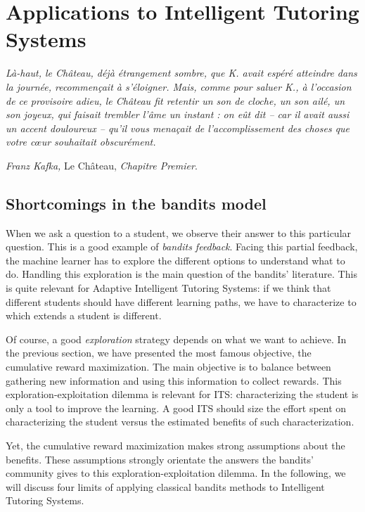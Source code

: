 \chapter{Applications to Intelligent Tutoring Systems}
\label{ch:its}
\vspace{-2.5cm}
\emph{Là-haut, le Château, déjà étrangement sombre, que K. avait
espéré atteindre dans la journée, recommençait à s’éloigner.
Mais, comme pour saluer K., à l’occasion de ce provisoire adieu,
le Château fit retentir un son de cloche, un son ailé, un son
joyeux, qui faisait trembler l’âme un instant : on eût dit – car il
avait aussi un accent douloureux – qu’il vous menaçait de
l’accomplissement des choses que votre cœur souhaitait obscurément. }\\ \vspace{-1.2cm}
\begin{flushright}\emph{Franz Kafka,} Le Château, \emph{Chapitre Premier}.
\end{flushright}
\section{Shortcomings in the bandits model}
When we ask a question to a student, we observe their answer to this particular question. This is a good example of \emph{bandits feedback}. Facing this partial feedback, the machine learner has to explore the different options to understand what to do. Handling this exploration is the main question of the bandits' literature. This is quite relevant for Adaptive Intelligent Tutoring Systems: if we think that different students should have different learning paths, we have to characterize to which extends a student is different. 

Of course, a good \emph{exploration} strategy depends on what we want to achieve. In the previous section, we have presented the most famous objective, \ie the cumulative reward maximization. The main objective is to balance between gathering new information and using this information to collect rewards. This exploration-exploitation dilemma is relevant for ITS: characterizing the student is only a tool to improve the learning. A good ITS should size the effort spent on characterizing the student versus the estimated benefits of such characterization. 

Yet, the cumulative reward maximization makes strong assumptions about the benefits. These assumptions strongly orientate the answers the bandits' community gives to this exploration-exploitation dilemma.
In the following, we will discuss four limits of applying classical bandits methods to Intelligent Tutoring Systems.

